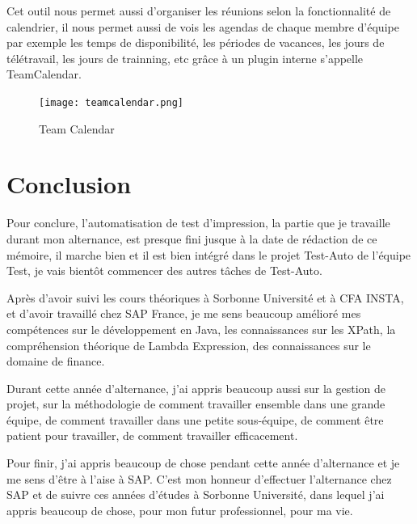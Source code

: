     \par Cet outil nous permet aussi d'organiser les réunions selon la fonctionnalité de calendrier, il nous permet aussi de vois les agendas de chaque membre d'équipe par exemple les temps de disponibilité, les périodes de vacances, les jours de télétravail, les jours de trainning, etc grâce à un plugin interne s'appelle TeamCalendar.
    \begin{figure}[H]
    	\centering
    	\texttt{[image: teamcalendar.png]}
    	\caption{Team Calendar}
    	\label{fig:teamCalendar_label}
    \end{figure}
    
\newpage
\section{Conclusion}
Pour conclure, l'automatisation de test d'impression, la partie que je travaille durant mon alternance, est presque fini jusque à la date de rédaction de ce mémoire, il marche bien et il est bien intégré dans le projet Test-Auto de l'équipe Test, je vais bientôt commencer des autres tâches de Test-Auto.
\par Après d'avoir suivi les cours théoriques à Sorbonne Université et à CFA INSTA, et d'avoir travaillé chez SAP France, je me sens beaucoup amélioré mes compétences sur le développement en Java, les connaissances sur les XPath, la compréhension théorique de Lambda Expression, des connaissances sur le domaine de finance.

\par Durant cette année d'alternance, j'ai appris beaucoup aussi sur la gestion de projet, sur la méthodologie de comment travailler ensemble dans une grande équipe, de comment travailler dans une petite sous-équipe, de comment être patient pour travailler, de comment travailler efficacement.

\par Pour finir, j'ai appris beaucoup de chose pendant cette année d'alternance et je me sens d'être à l'aise à SAP. C'est mon honneur d'effectuer l'alternance chez SAP et de suivre ces années d'études à Sorbonne Université, dans lequel j'ai appris beaucoup de chose, pour mon futur professionnel, pour ma vie.


\newpage


